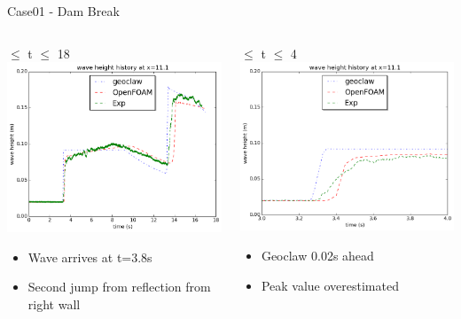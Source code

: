 \documentclass[xcolor=dvipsnames]{beamer}
\begin{document}
\begin{frame}[label=sec-5-2]{Case01 - Dam Break}
\begin{columns}
\begin{column}{0.5\textwidth}
\begin{block}{\qquad{} $\le$ t $\le$ 18}
\includegraphics[width=.9\linewidth]{../paper/plots/waveheight_nocolumn.png} \\
\begin{itemize}
\item Wave arrives at t=3.8s
\item Second jump from reflection from right wall
\end{itemize}
\end{block}
\end{column}

\begin{column}{0.5\textwidth}
\begin{block}{\qquad{} $\le$ t $\le$ 4}
\includegraphics[width=.9\linewidth]{../paper/plots/waveheight_nocolumn_zoomin.png}  \\
\begin{itemize}
\item Geoclaw 0.02s ahead
\item Peak value overestimated
\end{itemize}
\vskip5mm
\end{block}
\end{column}
\end{columns}
\end{frame}
\end{document}
